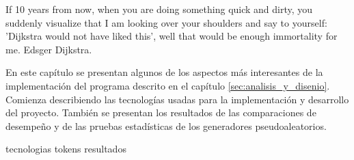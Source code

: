 %
%
%

{
  \epigrafe
  {%
    If 10 years from now, when you are doing something quick and dirty, you
    suddenly visualize that I am looking over your shoulders and say to
    yourself: 'Dijkstra would not have liked this', well that would be enough
    immortality for me.%
  }
  {%
     Edsger Dijkstra.%
  }
}

\noindent
En este capítulo se presentan algunos de los aspectos más interesantes de
la implementación del programa descrito en el capítulo
\ref{sec:analisis_y_disenio}. Comienza describiendo las tecnologías
usadas para la implementación y desarrollo del proyecto. También se presentan
los resultados de las comparaciones de desempeño y de las pruebas estadísticas
de los generadores pseudoaleatorios.

{tecnologias}
{tokens}
{resultados}
